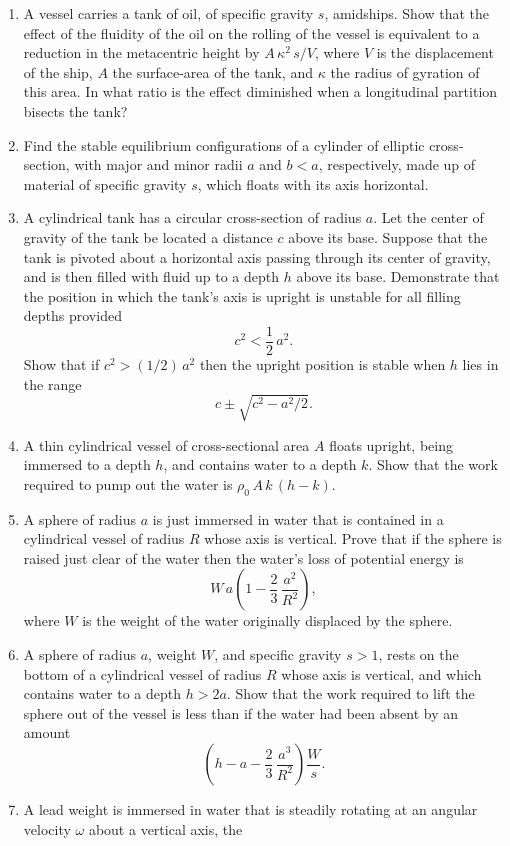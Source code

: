 {\begin{enumerate}
\item A vessel carries a tank of oil, of specific gravity $s$, amidships. Show that the effect of the fluidity of the
oil on the rolling of the vessel is equivalent to a reduction in the metacentric height by $A\,\kappa^2\,s/V$,
where $V$ is the displacement of the ship, $A$ the surface-area of the tank, and $\kappa$ the radius
of gyration of this area. In what ratio is the effect diminished when a longitudinal partition bisects the
tank?
\item Find the stable equilibrium configurations of a cylinder of elliptic cross-section, with major and minor radii $a$ and
$b<a$, respectively, made up of material of specific gravity $s$, which floats with its axis horizontal.
\item A cylindrical tank has a circular cross-section of radius $a$. 
Let the center of gravity of the tank be located a
distance $c$ above its base. Suppose that the tank is pivoted about a horizontal axis passing through its
center of gravity, and is then filled with fluid up to a depth $h$ above its base. Demonstrate that the position in which the
tank's axis is upright is unstable for all filling depths provided 
$$
c^2< \frac{1}{2}\,a^2.
$$
Show that if $c^2>(1/2)\,a^2$ then the upright position is stable when $h$ lies in the range
$$
 c\pm \sqrt{c^2-a^2/2}.
$$
\item A thin cylindrical vessel of cross-sectional area $A$ floats upright, being immersed to a depth $h$, and
contains water to a depth $k$. Show that the work required to pump out the water is $\rho_0\,A\,k\,(h-k)$. 
\item A sphere of radius $a$ is just immersed in water that is contained in a cylindrical vessel of radius $R$ whose
axis is vertical. Prove that if the sphere is raised just clear of the water then the water's loss of potential energy is 
$$
W\,a\left(1-\frac{2}{3}\,\frac{a^2}{R^2}\right),
$$
where $W$ is the weight of the water originally displaced by the sphere.
\item A sphere of radius $a$, weight $W$, and specific gravity $s>1$, rests on the bottom of
a cylindrical vessel of radius $R$ whose axis is vertical, and which contains
water to a depth $h>2a$. Show that the work required to lift the sphere out of the 
vessel is less than if the water had been absent by an amount
$$
\left(h-a-\frac{2}{3}\,\frac{a^3}{R^2}\right)\frac{W}{s}.
$$
\item A lead weight is immersed in water that is steadily rotating at an angular velocity $\omega$ about a vertical axis, the

\end{enumerate}}
